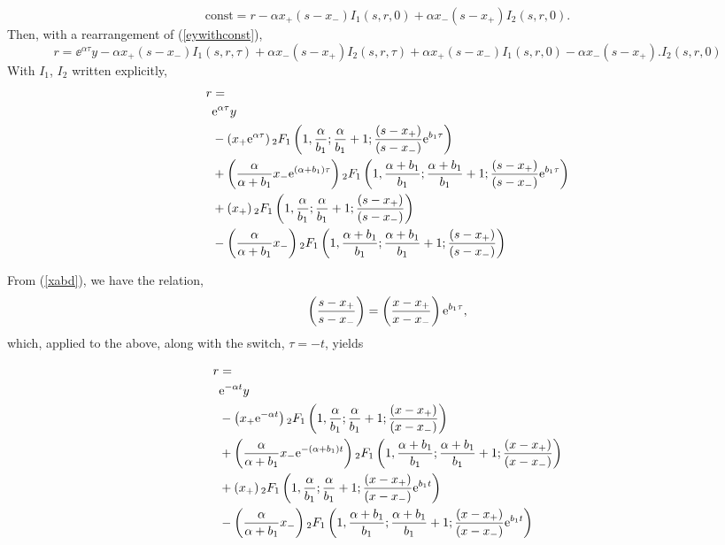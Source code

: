 $$\text{const} = r -  \alpha x_+(s-x_-)I_1(s,r,0) + \alpha x_- (s-x_+) I_2(s,r,0).$$ 
Then, with a rearrangement of (\ref{eywithconst}), 
\begin{equation*}
r = \ee^{\alpha\tau }y - \alpha x_+(s-x_-)I_1(s,r,\tau) + \alpha x_- (s-x_+) I_2(s,r,\tau) +  \alpha x_+(s-x_-)I_1(s,r,0) - \alpha x_- (s-x_+). I_2(s,r,0)
\end{equation*}
With $I_1$, $I_2$ written explicitly,
\begin{align*}
r &= \\
 &{\rm e}^{\alpha\tau }y\\ 
 &- \left( x_+ {\rm e}^{\alpha\tau}\right){}_2 F_1 \left(1,\frac{\alpha}{b_1 };\frac{\alpha}{b_1 }+1; \frac{(s-x_+)}{(s-x_-)}{\rm e}^{b_1  \tau}\right)\\
&+\left(\frac{\alpha  }{\alpha + b_1}x_-{\rm e}^{(\alpha + b_1)\tau}\right){}_2F_1\left(1,\frac{\alpha + b_1 }{b_1 };\frac{\alpha + b_1 }{b_1 }+1; \frac{(s-x_+)}{(s-x_-)}{\rm e}^{b_1  \tau}\right)\\
&+ \left( x_+\right){}_2 F_1 \left(1,\frac{\alpha}{b_1 };\frac{\alpha}{b_1 }+1; \frac{(s-x_+)}{(s-x_-)}\right)\\
&- \left(\frac{\alpha  }{\alpha + b_1}x_-\right){}_2F_1\left(1,\frac{\alpha + b_1 }{b_1 };\frac{\alpha + b_1 }{b_1 }+1; \frac{(s-x_+)}{(s-x_-)}\right)
\end{align*}

\noindent
From (\ref{xabd}), we have the relation,
$$\left(\frac{s-x_+}{s-x_-}\right) = \left(\frac{x-x_+}{x-x_-}\right){\rm e}^{b_1\tau},$$
which, applied to  the above, along with the switch, $\tau = -t$, yields 

\begin{align*}
r &= \\
 &{\rm e}^{-\alpha t }y\\ 
 &- \left( x_+ {\rm e}^{-\alpha t}\right){}_2 F_1 \left(1,\frac{\alpha}{b_1 };\frac{\alpha}{b_1 }+1; \frac{(x-x_+)}{(x-x_-)}\right)\\
&+\left(\frac{\alpha  }{\alpha + b_1}x_-{\rm e}^{-(\alpha + b_1)t}\right){}_2F_1\left(1,\frac{\alpha + b_1 }{b_1 };\frac{\alpha + b_1 }{b_1 }+1; \frac{(x-x_+)}{(x-x_-)}\right)\\
&+ \left( x_+\right){}_2 F_1 \left(1,\frac{\alpha}{b_1 };\frac{\alpha}{b_1 }+1; \frac{(x-x_+)}{(x-x_-)}{\rm e}^{b_1  t}\right)\\
&- \left(\frac{\alpha  }{\alpha + b_1}x_-\right){}_2F_1\left(1,\frac{\alpha + b_1 }{b_1 };\frac{\alpha + b_1 }{b_1 }+1; \frac{(x-x_+)}{(x-x_-)}{\rm e}^{b_1  t}\right)
\end{align*}

